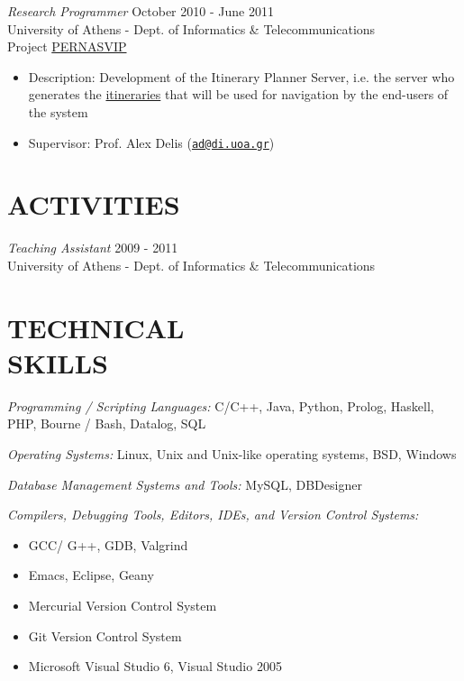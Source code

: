 \documentclass[margin]{res}
\begin{document}
\begin{resume}
        {\sl Research Programmer} \hfill October 2010 - June 2011 \\
        University of Athens - Dept. of Informatics \& Telecommunications \\
        Project \href{http://pernasvip.di.uoa.gr/index.php}{PERNASVIP}
        \begin{itemize}
        \item Description: Development of the Itinerary Planner
          Server, i.e. the server who generates the
          \href{http://pernasvip.di.uoa.gr/index.php/gen-spef/itinerary-example}{itineraries}
          that will be used for navigation by the end-users of the
          system
        \item Supervisor: Prof. Alex Delis
          (\href{mailto:ad@di.uoa.gr}{\nolinkurl{ad@di.uoa.gr}})
        \end{itemize}

\section{ACTIVITIES}
        {\sl Teaching Assistant} \hfill 2009 - 2011 \\
        University of Athens - Dept. of Informatics \& Telecommunications

\section{TECHNICAL \\ SKILLS}
        {\sl Programming / Scripting Languages:} 
        C/C++, Java, Python, Prolog, Haskell, PHP, Bourne / Bash, Datalog, SQL

        {\sl Operating Systems:}
        Linux, Unix and Unix-like operating systems, BSD, Windows

        {\sl Database Management Systems and Tools:}
        MySQL, DBDesigner

        {\sl Compilers, Debugging Tools, Editors, IDEs, and Version Control Systems:}
        \begin{itemize}
        \item GCC/ G++, GDB, Valgrind
        \item Emacs, Eclipse, Geany
        \item Mercurial Version Control System
        \item Git Version Control System
        \item Microsoft Visual Studio 6, Visual Studio 2005
        \end{itemize}


\end{resume}
\end{document}
